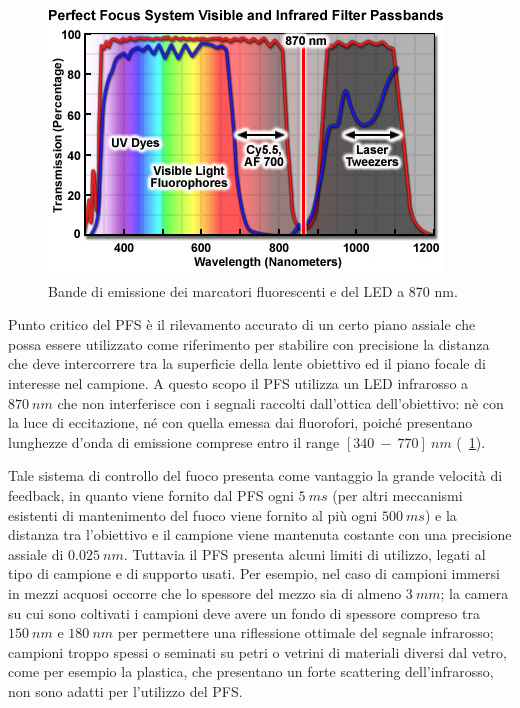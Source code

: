 \begin{figure}
 \centering
 \includegraphics[scale=.70]{img/CAP2bande.png}
 \caption{\small{Bande di emissione dei marcatori fluorescenti e del LED a 870 nm.}}
 \label{fig:bande}
\end{figure}

Punto critico del PFS è il rilevamento accurato di un certo piano assiale che possa essere utilizzato come riferimento per stabilire con precisione la distanza che deve intercorrere tra la superficie della lente obiettivo ed il piano focale di interesse nel campione. 
A questo scopo il PFS utilizza un LED infrarosso a $870\ nm$ che non interferisce con i segnali raccolti dall'ottica dell'obiettivo: nè con la luce di eccitazione, né con quella emessa dai fluorofori, poiché presentano lunghezze d'onda di emissione comprese entro il range $[340\ -\ 770]\ nm$ (\figurename~\ref{fig:bande}).

Tale sistema di controllo del fuoco presenta come vantaggio la grande velocità di feedback, in quanto viene fornito dal PFS ogni $5\ ms$ (per altri meccanismi esistenti di mantenimento del fuoco viene fornito al più ogni $500\ ms$) e la distanza tra l'obiettivo e il campione viene mantenuta costante con una precisione assiale di $0.025\ nm$. 
Tuttavia il PFS presenta alcuni limiti di utilizzo, legati al tipo di campione e di supporto usati. 
Per esempio, nel caso di campioni immersi in mezzi acquosi occorre che lo spessore del mezzo sia di almeno $3\ mm$; la camera su cui sono coltivati i campioni deve avere un fondo di spessore compreso tra $150\ nm$ e $180\ nm$ per permettere una riflessione ottimale del segnale infrarosso; campioni troppo spessi o seminati su petri o vetrini di materiali diversi dal vetro, come per esempio la plastica, che presentano un forte scattering dell'infrarosso, non sono adatti per l'utilizzo del PFS. 


